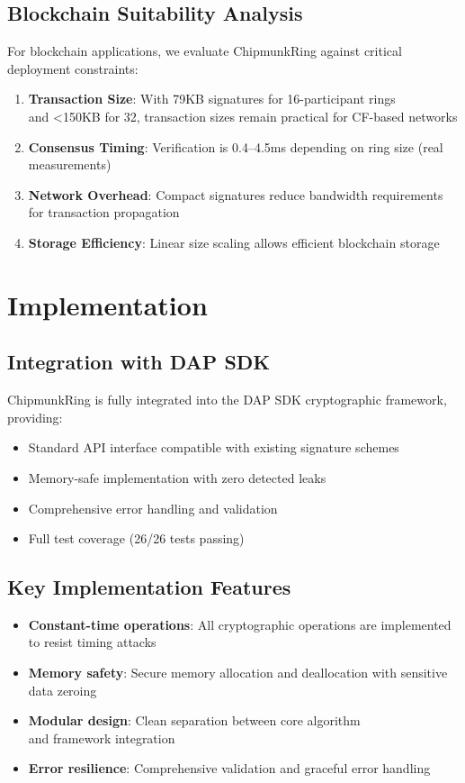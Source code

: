 \documentclass[11pt,a4paper]{article}
\begin{document}
\subsection{Blockchain Suitability Analysis}

For blockchain applications, we evaluate ChipmunkRing against critical deployment constraints:

\begin{enumerate}
\item \textbf{Transaction Size}: With 79KB signatures for 16-participant rings \\
and \textless150KB for 32, transaction sizes remain practical for CF-based networks
\item \textbf{Consensus Timing}: Verification is 0.4--4.5ms depending on ring size (real measurements)
\item \textbf{Network Overhead}: Compact signatures reduce bandwidth requirements for transaction propagation
\item \textbf{Storage Efficiency}: Linear size scaling allows efficient blockchain storage
\end{enumerate}

\section{Implementation}

\subsection{Integration with DAP SDK}

ChipmunkRing is fully integrated into the DAP SDK cryptographic framework, providing:

\begin{itemize}
\item Standard API interface compatible with existing signature schemes
\item Memory-safe implementation with zero detected leaks
\item Comprehensive error handling and validation
\item Full test coverage (26/26 tests passing)
\end{itemize}

\subsection{Key Implementation Features}

\begin{itemize}
\item \textbf{Constant-time operations}: All cryptographic operations are implemented to resist timing attacks
\item \textbf{Memory safety}: Secure memory allocation and deallocation with sensitive data zeroing
\item \textbf{Modular design}: Clean separation between core algorithm \\
and framework integration
\item \textbf{Error resilience}: Comprehensive validation and graceful error handling
\end{itemize}
\end{document}

